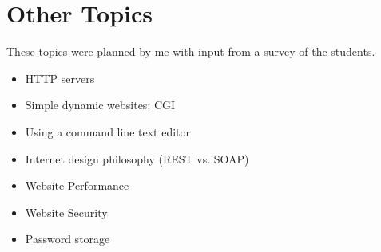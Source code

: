 \documentclass{article}
\begin{document}
\section{Other Topics}
These topics were planned by me with input from a survey of the students.
\begin{itemize}
\item HTTP servers
\item Simple dynamic websites:  CGI
\item Using a command line text editor
\item Internet design philosophy (REST vs. SOAP)
\item Website Performance
\item Website Security
\item Password storage
\end{itemize}
\end{document}

